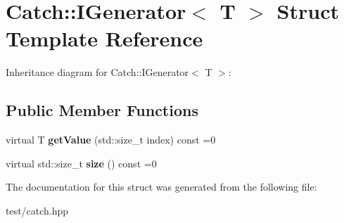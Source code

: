 \hypertarget{structCatch_1_1IGenerator}{}\section{Catch\+:\+:I\+Generator$<$ T $>$ Struct Template Reference}
\label{structCatch_1_1IGenerator}


Inheritance diagram for Catch\+:\+:I\+Generator$<$ T $>$\+:
\subsection*{Public Member Functions}
\begin{DoxyCompactItemize}
\item 
virtual T {\bfseries get\+Value} (std\+::size\+\_\+t index) const =0\hypertarget{structCatch_1_1IGenerator_ad69e937cb66dba3ed9429c42abf4fce3}{}\label{structCatch_1_1IGenerator_ad69e937cb66dba3ed9429c42abf4fce3}

\item 
virtual std\+::size\+\_\+t {\bfseries size} () const =0\hypertarget{structCatch_1_1IGenerator_a2e317253b03e838b6065ce69719a198e}{}\label{structCatch_1_1IGenerator_a2e317253b03e838b6065ce69719a198e}

\end{DoxyCompactItemize}


The documentation for this struct was generated from the following file\+:\begin{DoxyCompactItemize}
\item 
test/catch.\+hpp\end{DoxyCompactItemize}

